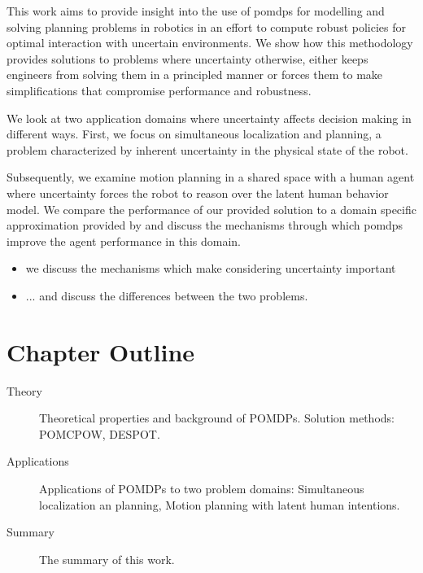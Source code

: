 This work aims to provide insight into the use of \acp{pomdp} for modelling and
solving planning problems in robotics in an effort to compute robust policies
for optimal interaction with uncertain environments. We show how this
methodology provides solutions to problems where uncertainty otherwise, either
keeps engineers from solving them in a principled manner or forces them to make
simplifications that compromise performance and robustness.



We look at two application domains where uncertainty affects decision making
in different ways. First, we focus on simultaneous localization and
planning, a problem characterized by inherent uncertainty in the physical state
of the robot.

Subsequently, we examine motion planning in a shared space with a human agent
where uncertainty forces the robot to reason over the latent human behavior
model. We compare the performance of our provided solution to a domain specific
approximation provided by \cite{fisac2018probabilistically} and discuss the mechanisms
through which \acp{pomdp} improve the agent performance in this domain.

\begin{itemize}
  \item we discuss the mechanisms which make considering uncertainty important
  \item ... and discuss the differences between the two problems.
\end{itemize}


%
% 

\section{Chapter Outline}


\begin{description}
  \item[Theory] Theoretical properties and background of POMDPs. Solution methods: POMCPOW, DESPOT.
  \item[Applications] Applications of POMDPs to two problem domains: Simultaneous localization an planning, Motion planning with latent human intentions.
  \item[Summary] The summary of this work.
\end{description}
